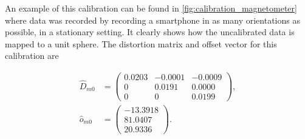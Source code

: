 An example of this calibration can be found in \cref{fig:calibration_magnetometer} where data was recorded by recording a smartphone in as many orientations as possible, in a stationary setting. It clearly shows how the uncalibrated data is mapped to a unit sphere. The distortion matrix and offset vector for this calibration are 

\begin{subequations}
	\begin{align}
	\widehat{D}_{m0} &= \left(\begin{array}{rrr}
		0.0203 & -0.0001 & -0.0009 \\
		0 & 0.0191 & 0.0000 \\
		0 & 0 & 0.0199
	\end{array}\right), \\
	\widehat{o}_{m0} &= \left(\begin{array}{r}
		-13.3918 \\
		81.0407 \\
		20.9336
	\end{array}\right).
	\end{align}
	
\end{subequations}


